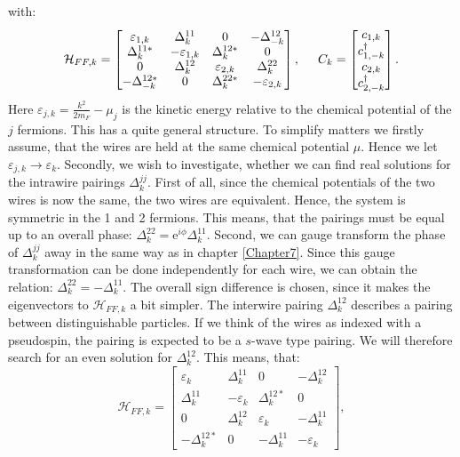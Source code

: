 with:
\begin{equation}
\mathcal{H}_{FF,k} = \begin{bmatrix} \varepsilon_{1,k} & \Delta^{11}_k      & 0                 & -\Delta^{12}_{-k} \\ 
                                     \Delta^{11 *}_k   & -\varepsilon_{1,k} & \Delta^{12*}_k    & 0 \\ 
                                    0                  & \Delta^{12}_k      & \varepsilon_{2,k} & \Delta^{22}_k \\ 
                                     -\Delta^{12*}_{-k}& 0                  & \Delta^{22*}_k    & -\varepsilon_{2,k} \end{bmatrix}, \hspace{0.5cm}
C_k =  \begin{bmatrix} c_{1,k} \\ c^\dagger_{1,-k} \\ c_{2,k} \\ c^\dagger_{2,-k} \end{bmatrix}.                                     
\end{equation}
Here $\varepsilon_{j,k} = \frac{k^2}{2m_F}-\mu_j$ is the kinetic energy relative to the chemical potential of the $j$ fermions. This has a quite general structure. To simplify matters we firstly assume, that the wires are held at the same chemical potential $\mu$. Hence we let $\varepsilon_{j,k} \to \varepsilon_k$. Secondly, we wish to investigate, whether we can find real solutions for the intrawire pairings $\Delta^{jj}_k$. First of all, since the chemical potentials of the two wires is now the same, the two wires are equivalent. Hence, the system is symmetric in the 1 and 2 fermions. This means, that the pairings must be equal up to an overall phase: $\Delta^{22}_k = \text{e}^{i\phi} \Delta^{11}_k$. Second, we can gauge transform the phase of $\Delta^{jj}_k$ away in the same way as in chapter \ref{Chapter7}. Since this gauge transformation can be done independently for each wire, we can obtain the relation: $\Delta^{22}_k = -\Delta^{11}_k$. The overall sign difference is chosen, since it makes the eigenvectors to $\mathcal{H}_{FF,k}$ a bit simpler. The interwire pairing $\Delta^{12}_k$ describes a pairing between distinguishable particles. If we think of the wires as indexed with a pseudospin, the pairing is expected to be a $s$-wave type pairing. We will therefore search for an even solution for $\Delta^{12}_k$. This means, that:
\begin{equation}
\mathcal{H}_{FF,k} = \begin{bmatrix} \varepsilon_{k}   & \Delta^{11}_k      & 0                 & -\Delta^{12}_{k} \\ 
                                     \Delta^{11}_k     & -\varepsilon_{k}   & \Delta^{12*}_k    & 0 \\ 
                                    0                  & \Delta^{12}_k      & \varepsilon_{k}   & -\Delta^{11}_k \\ 
                                     -\Delta^{12*}_{k} & 0                  & -\Delta^{11}_k     & -\varepsilon_{k} \end{bmatrix},                  
\end{equation}
